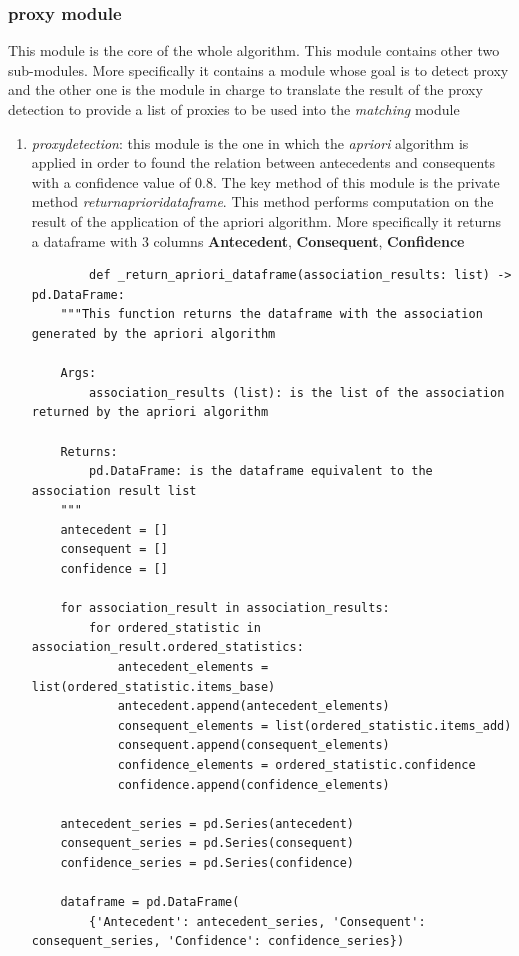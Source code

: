 \documentclass[12pt,a4paper,openright,twoside]{book}
\begin{document}
\subsubsection{proxy module}
This module is the core of the whole algorithm. This module contains other two sub-modules. More specifically it contains a module whose goal is to detect proxy and the other one is the module in charge to translate the result of the proxy detection to provide a list of proxies to be used into the \emph{matching} module
\begin{enumerate}
    \item \emph{proxy\textunderscore detection}: this module is the one in which the \emph{apriori} algorithm is applied in order to found the relation between antecedents and consequents with a confidence value of 0.8. The key method of this module is the private method \emph{\textunderscore return\textunderscore apriori\textunderscore dataframe}. This method performs computation on the result of the application of the apriori algorithm. More specifically it returns a dataframe with 3 columns \textbf{Antecedent}, \textbf{Consequent}, \textbf{Confidence} \\
    \begin{lstlisting}
        def _return_apriori_dataframe(association_results: list) -> pd.DataFrame:
    """This function returns the dataframe with the association generated by the apriori algorithm

    Args:
        association_results (list): is the list of the association returned by the apriori algorithm

    Returns:
        pd.DataFrame: is the dataframe equivalent to the association result list
    """
    antecedent = []
    consequent = []
    confidence = []

    for association_result in association_results:
        for ordered_statistic in association_result.ordered_statistics:
            antecedent_elements = list(ordered_statistic.items_base)
            antecedent.append(antecedent_elements)
            consequent_elements = list(ordered_statistic.items_add)
            consequent.append(consequent_elements)
            confidence_elements = ordered_statistic.confidence
            confidence.append(confidence_elements)

    antecedent_series = pd.Series(antecedent)
    consequent_series = pd.Series(consequent)
    confidence_series = pd.Series(confidence)

    dataframe = pd.DataFrame(
        {'Antecedent': antecedent_series, 'Consequent': consequent_series, 'Confidence': confidence_series})


\end{lstlisting}
\end{enumerate}
\end{document}
